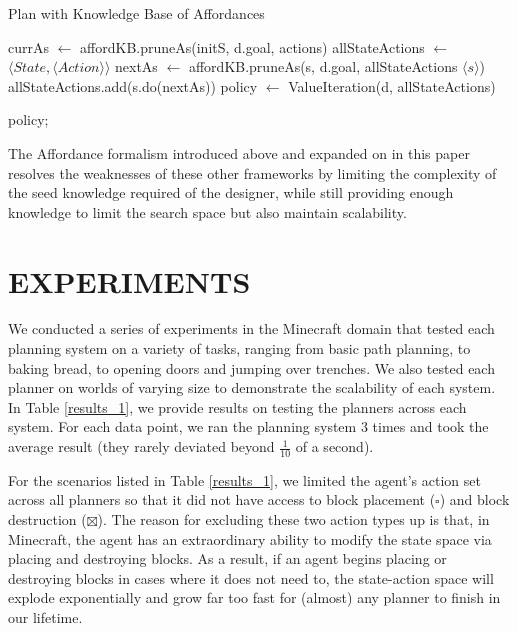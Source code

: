 \documentclass[]{article}
\begin{document}

\begin{algorithm}
  \caption{Plan with Knowledge Base of Affordances}

  \begin{algorithmic}
    \State {}
    \State currAs $\gets$ affordKB.pruneAs(initS, d.goal, actions)
    \State allStateActions $\gets$ $\langle State ,\langle Action \rangle \rangle$
	\State nextAs $\gets$ affordKB.pruneAs(s, d.goal, allStateActions $\langle s \rangle$)
	\State allStateActions.add(s.do(nextAs))
    \EndFor
    \State {}
    \State policy $\gets$ ValueIteration(d, allStateActions)
    
    \Return policy;
  \end{algorithmic}
\end{algorithm}


The Affordance formalism introduced above and expanded on in this 
paper resolves the weaknesses of these other frameworks by limiting 
the complexity of the seed knowledge required of the designer, while 
still providing enough knowledge to limit the search space but also 
maintain scalability.

\section{EXPERIMENTS}

We conducted a series of experiments in the Minecraft domain that tested 
each planning system on a variety of tasks, ranging from basic path planning,
 to baking bread, to opening doors and jumping over trenches.  We also tested 
 each planner on worlds of varying size to demonstrate the scalability of each 
 system. In Table \ref{results_1}, we provide results on testing the planners 
 across each system. For each data point, we ran the planning system 3 times 
 and took the average result (they rarely deviated beyond $\frac{1}{10}$ of a second).

For the scenarios listed in Table \ref{results_1}, we limited the agent's 
action set across all planners so that it did not have access to block 
placement ($\square$) and block destruction ($\boxtimes$). The reason 
for excluding these two action types up is that, in Minecraft, the agent 
has an extraordinary ability to modify the state space via placing and 
destroying blocks. As a result, if an agent begins placing or destroying 
blocks in cases where it does not need to, the state-action space will 
explode exponentially and grow far too fast for (almost) any planner to 
finish in our lifetime. 
\end{document}
